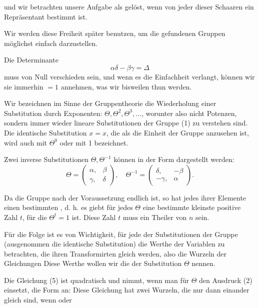 und wir betrachten unsere Aufgabe als gelöst, wenn von jeder
dieser Schaaren ein Repräsentant bestimmt ist.

Wir werden diese Freiheit später benutzen, um die gefundenen
Gruppen möglichst einfach darzustellen.

Die Determinante
\[
\alpha\delta - \beta\gamma = \Delta
\]
muss von Null verschieden sein, und wenn es die Einfachheit
verlangt, können wir sie immerhin $= 1$ annehmen, was wir bisweilen
thun werden.

Wir bezeichnen im Sinne der Gruppentheorie die Wiederholung
einer Substitution durch Exponenten: $\Theta, \Theta^2, \Theta^3, \ldots$,
worunter also nicht Potenzen, sondern immer wieder lineare
Substitutionen der Gruppe (1) zu verstehen sind. Die identische
Substitution $x = x$, die als die Einheit der Gruppe anzusehen
ist, wird auch mit $\Theta^0$ oder mit 1 bezeichnet.

Zwei inverse Substitutionen $\Theta, \Theta^{-1}$ können in der Form
dargestellt werden:
\[
\Theta = \begin{pmatrix} \alpha, & \beta \\ \gamma, & \delta \end{pmatrix}, \quad
\Theta^{-1} = \begin{pmatrix} \delta, & -\beta \\ -\gamma, & \alpha \end{pmatrix}.
\]

Da die Gruppe nach der Voraussetzung endlich ist, so hat
jedes ihrer Elemente einen bestimmten , d. h. es giebt für
jedes $\Theta$ eine bestimmte kleinste positive Zahl $t$, für die $\Theta^t = 1$
ist. Diese Zahl $t$ muss ein Theiler von $n$ sein.

Für die Folge ist es von Wichtigkeit, für jede der Substitutionen
der Gruppe (ausgenommen die identische Substitution)
die Werthe der Variablen zu betrachten, die ihren Transformirten
gleich werden, also die Wurzeln der Gleichungen
Diese Werthe wollen wir die  der Substitution $\Theta$
nennen.

Die Gleichung (5) ist quadratisch und nimmt, wenn man
für $\Theta$ den Ausdruck (2) einsetzt, die Form an:
Diese Gleichung hat zwei Wurzeln, die nur dann einander
gleich sind, wenn
oder
